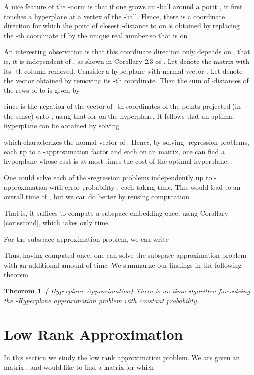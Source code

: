 \documentclass[11pt]{article}
\newtheorem{theorem}{Theorem}
\begin{document}
A nice feature of the -norm is that if one grows an -ball around a point ,
it first touches a hyperplane  at a vertex of the -ball. Hence, there is a coordinate
direction  for which the point of closest -distance to  on  is obtained by
replacing the -th coordinate of  by the unique real number  so that 
 is on . 

An interesting observation is that this coordinate direction  only depends on , that is,
it is independent of , as shown in Corollary 2.3 of \cite{m97}. Let  denote the matrix
 with its -th column removed. Consider a hyperplane  with normal vector . Let 
denote the vector obtained by removing its -th coordinate. Then the
sum of -distances of the rows  of  to  is given by

since  is the negation of the vector of -th coordinates of the points projected
(in the  sense) onto , using that  
for  on the hyperplane. It follows that an optimal
hyperplane  can be obtained by solving

which characterizes the normal vector  of . Hence, by solving  -regression problems,
each up to a -approximation factor and each on an  matrix, 
one can find a hyperplane whose cost is at most  times the cost of the optimal hyperplane.

One could solve each of the  -regression problems independently up to -approximation with error
probability , each taking  time. This would lead to
an overall time of , but we can do better by reusing computation. 

That is, it suffices to compute a subspace embedding  once, using Corollary \ref{cor:second}, which
takes only  time. 

For the subspace approximation problem, we can write

Thus, having computed  once, one can solve the subspace approximation problem with an
additional  amount of time. We summarize our findings in the following theorem. 

\begin{theorem}(-Hyperplane Approximation)
There is an  time algorithm for solving the -Hyperplane
approximation problem with constant probability. 
\end{theorem}

\section{Low Rank Approximation}\label{chap:lowRank}
In this section we study the low rank approximation problem. We are given
an  matrix , and would like to find a matrix 
for which 
\end{document}

